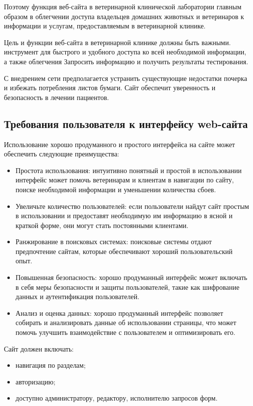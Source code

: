 Поэтому функция веб-сайта в ветеринарной клинической лаборатории
главным образом в облегчении доступа владельцев домашних животных и ветеринаров к информации и услугам, предоставляемым в ветеринарной клинике.

Цель и функции веб-сайта в ветеринарной клинике должны быть важными.
инструмент для быстрого и удобного доступа ко всей необходимой информации, а также облегчения
Запросить информацию и получить результаты тестирования.

С внедрением сети предполагается устранить существующие недостатки почерка и избежать потребления листов бумаги. Сайт обеспечит уверенность и безопасность в лечении пациентов.

\subsection{Требования пользователя к интерфейсу web-сайта}

Использование хорошо продуманного и простого интерфейса на сайте может обеспечить следующие преимущества:

\begin{itemize}
\item Простота использования: интуитивно понятный и простой в использовании интерфейс может помочь ветеринарам и клиентам в навигации по сайту, поиске необходимой информации и уменьшении количества сбоев.

\item Увеличьте количество пользователей: если пользователи найдут сайт простым в использовании и предоставят необходимую им информацию в ясной и краткой форме, они могут стать постоянными клиентами.

\item Ранжирование в поисковых системах: поисковые системы отдают предпочтение сайтам, которые обеспечивают хороший пользовательский опыт.

\item Повышенная безопасность: хорошо продуманный интерфейс может включать в себя меры безопасности и защиты пользователей, такие как шифрование данных и аутентификация пользователей.

\item Анализ и оценка данных: хорошо продуманный интерфейс позволяет собирать и анализировать данные об использовании страницы, что может помочь улучшить взаимодействие с пользователем и оптимизировать его.
\end{itemize}
Сайт должен включать:
\begin{itemize}
    \item навигация по разделам;
    \item авторизацию;
    \item доступно администратору, редактору, исполнителю запросов форм.
\end{itemize}

